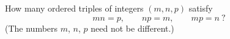 How many ordered triples of integers $(m,n,p)$ satisfy
\[
mn=p,\qquad np=m,\qquad mp=n\ ?
\]
(The numbers $m$, $n$, $p$ need not be different.)
